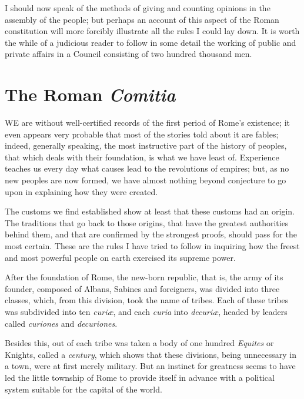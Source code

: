 \documentclass[12pt]{report}
\begin{document}
I should now speak of the methods of giving and counting opinions in the assembly of the people; but perhaps an account of this aspect of the Roman constitution will more forcibly illustrate all the rules I could lay down. It is worth the while of a judicious reader to follow in some detail the working of public and private affairs in a Council consisting of two hundred thousand men.

\section{The Roman \textit{Comitia}}
WE are without well-certified records of the first period of Rome's existence; it even appears very probable that most of the stories told about it are fables; indeed, generally speaking, the most instructive part of the history of peoples, that which deals with their foundation, is what we have least of. Experience teaches us every day what causes lead to the revolutions of empires; but, as no new peoples are now formed, we have almost nothing beyond conjecture to go upon in explaining how they were created.

The customs we find established show at least that these customs had an origin. The traditions that go back to those origins, that have the greatest authorities behind them, and that are confirmed by the strongest proofs, should pass for the most certain. These are the rules I have tried to follow in inquiring how the freest and most powerful people on earth exercised its supreme power.

After the foundation of Rome, the new-born republic, that is, the army of its founder, composed of Albans, Sabines and foreigners, was divided into three classes, which, from this division, took the name of tribes. Each of these tribes was subdivided into ten \textit{curiæ}, and each \textit{curia} into \textit{decuriæ}, headed by leaders called \textit{curiones} and \textit{decuriones}.

Besides this, out of each tribe was taken a body of one hundred \textit{Equites} or Knights, called a \textit{century}, which shows that these divisions, being unnecessary in a town, were at first merely military. But an instinct for greatness seems to have led the little township of Rome to provide itself in advance with a political system suitable for the capital of the world.
\end{document}
